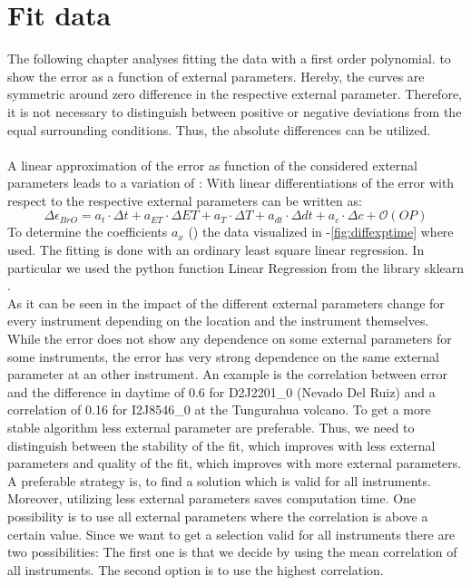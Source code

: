 \documentclass  [
  paper    = a4,
  BCOR     = 10mm,
  twoside,
  fontsize = 12pt,
  fleqn,
  toc      = bibnumbered,
  toc      = listofnumbered,
  numbers  = noendperiod,
  headings = normal,
  listof   = leveldown,
  version  = 3.03
]                                       {scrreprt}
\begin{document}
	\section{Fit data}
	The following chapter analyses fitting the data with a first order polynomial.  to  show the   error as a function of external parameters. Hereby, the curves are symmetric around zero difference in the respective external parameter. Therefore, it is not necessary to distinguish between positive or negative deviations from the equal surrounding conditions. Thus, the absolute differences can be utilized.\\
	\\
	A linear approximation of the   error as function of the considered external parameters leads to a variation of   :
	With linear differentiations of the   error with respect to the respective external parameters  can be written as:	
	\begin{equation}
		\Delta \epsilon_{BrO} = a_{t}\cdot\Delta t+a_{ET}\cdot\Delta ET+a_{T}\cdot\Delta T+a_{dt}\cdot\Delta dt +a_{c}\cdot\Delta c + \mathcal{O}\left(OP\right)
		\label{calc:delterr}
	\end{equation}
	To determine the coefficients $a_{x}$ () the data visualized in -\ref{fig:diffexptime} where used.  The fitting is done with an ordinary least square linear regression. In particular we used the python function Linear Regression from the library sklearn \citep{SKlearn}. \\
	
	As it can be seen in  the impact of the different external parameters change for every instrument depending on the location and the instrument themselves. 
	While the   error does not show any dependence on some external parameters for some instruments, the error has very strong dependence on the same external parameter at an other instrument. An example is the correlation between   error and the difference in daytime of 0.6 for D2J2201\_0 (Nevado Del Ruiz) and a correlation of 0.16 for I2J8546\_0 at the Tungurahua volcano.
	To get a more stable algorithm less external parameter are preferable. Thus, we need to distinguish between the stability of the fit, which improves with less external parameters and quality of the fit, which improves with more external parameters. 
	A preferable strategy is, to find a solution which is valid for all instruments. Moreover, utilizing less external parameters saves computation time.
	One possibility is to use all external parameters where the correlation is above a certain value. Since we want to get a selection valid for all instruments there are two possibilities: The first one is that we decide by using the mean correlation of all instruments. The second option is to use the highest correlation.
	
\end{document}
